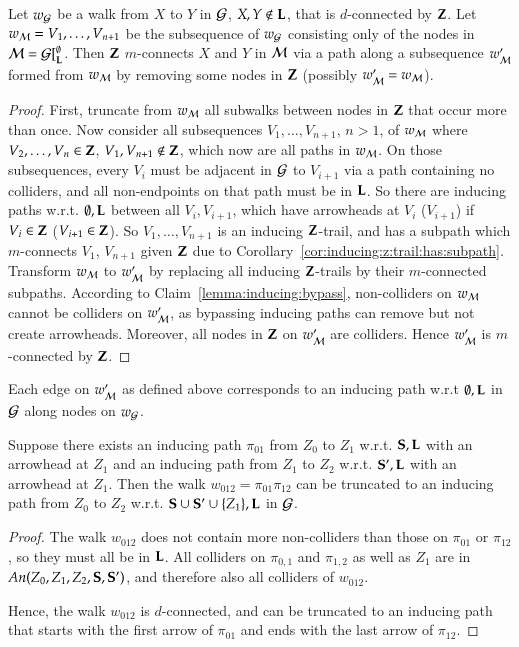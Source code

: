 \begin{lemma}
\label{lemma:auxiliary:truncatemaxsub}
Let $w_{\cal G}$ be a walk from $X$ to $Y$ in ${\cal G}$,
$X, Y \notin {\bf L}$, 
that is $d$-connected by ${\bf Z}$.
Let $w_{\cal M}=V_1,\ldots,V_{n+1}$ 
be the subsequence of $w_{\cal G}$ consisting only of the nodes in 
${\cal M}={\cal G}[^\emptyset_{\bf L}$.
Then ${\bf Z}$ $m$-connects $X$ and $Y$ in ${\cal M}$  via a path along a 
subsequence $w_{\cal M}'$ formed from $w_{\cal M}$ by removing some nodes
in ${\bf Z}$ (possibly $w_{\cal M}'=w_{\cal M}$). 
\end{lemma}

\begin{proof}
First, truncate from $w_{\cal M}$ all
subwalks between nodes in ${\bf Z}$ that occur more than once.
Now consider all subsequences $V_1,\ldots,V_{n+1}$, $n>1$,
of $w_{\cal M}$ where $V_2,\ldots,V_n \in {\bf Z}$, $V_1,V_{n+1} \notin {\bf Z}$,
which now are all paths in $w_{\cal M}$.
On those subsequences, every $V_i$ must be adjacent in ${\cal G}$ to  $V_{i+1}$
via a path containing no colliders, and all non-endpoints on that path
must be in ${\bf L}$. So there are inducing paths w.r.t. $\emptyset,{\bf L}$ between
all $V_{i}, V_{i+1}$, which have arrowheads at 
$V_i$ ($V_{i+1}$) if $V_i\in{\bf Z}$ ($V_{i+1}\in{\bf Z}$). So 
$V_1,\ldots,V_{n+1}$ is an inducing ${\bf Z}$-trail, and has a subpath
which $m$-connects $V_1$, $V_{n+1}$ given ${\bf Z}$ due to Corollary~\ref{cor:inducing:z:trail:has:subpath}. Transform 
$w_{\cal M}$ to $w_{\cal M}'$ by replacing all inducing ${\bf Z}$-trails by
their $m$-connected subpaths. According to
Claim~\ref{lemma:inducing:bypass}, non-colliders on $w_{\cal M}$ 
cannot be colliders on $w_{\cal M}'$, as bypassing inducing paths
can remove but not create arrowheads.
Moreover, all nodes in ${\bf Z}$ on
$w_{\cal M}'$ are colliders. Hence $w_{\cal M}'$ is $m$-connected by
${\bf Z}$.
\end{proof}

\begin{corollary}
Each edge on $w_{\cal M}'$ as defined above corresponds to 
an inducing path w.r.t $\emptyset,{\bf L}$ in ${\cal G}$ along
nodes on $w_{\cal G}$.
\end{corollary}

\begin{claim}\label{lemma:inducing:concat:collider}
Suppose there exists an inducing path $\pi_{01}$ from $Z_0$ to $Z_1$ w.r.t. ${\bf S}, {\bf L}$ with an arrowhead at $Z_1$ and an inducing path from $Z_1$ to $Z_2$  w.r.t. ${\bf S}', {\bf L}$ with an arrowhead at $Z_1$.  Then the walk
$w_{012} = \pi_{01}\pi_{12}$ can be 
truncated to an inducing path from
$Z_0$ to $Z_2$ w.r.t. ${\bf S} \cup {\bf S}' \cup \{Z_1\},{\bf L}$ in ${\cal G}$.
\end{claim}
\begin{proof}
The walk $w_{012}$ does not contain more non-colliders than
those on $\pi_{01}$ or $\pi_{12}$, so they must all be in ${\bf L}$.
All colliders on $\pi_{0,1}$ and $\pi_{1,2}$ as well as $Z_1$ are in $\textit{An}(Z_0, Z_{1}, Z_2,{\bf S},{\bf S}')$,
and therefore also all colliders of $w_{012}$.

Hence, the walk $w_{012}$ is $d$-connected,
and can be truncated to an inducing path that starts
with the first arrow of $\pi_{01}$ and ends
with the last arrow of $\pi_{12}$.
\end{proof}
 
